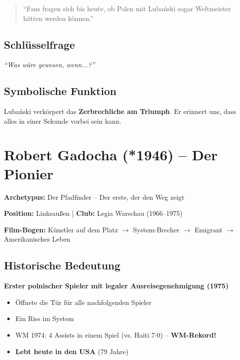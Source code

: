 \documentclass[11pt,a4paper]{book}
\newenvironment{filminfo}{%
  \begin{mdframed}[
    linecolor=darkgray,
    linewidth=1pt,
    backgroundcolor=gray!5,
    innertopmargin=10pt,
    innerbottommargin=10pt
  ]
}{%
  \end{mdframed}
}
\newenvironment{kontextbox}{%
  \begin{mdframed}[
    linecolor=polishred,
    linewidth=1pt,
    backgroundcolor=white,
    leftmargin=20pt,
    rightmargin=20pt
  ]
}{%
  \end{mdframed}
}
\begin{document}
\begin{quote}
``Fans fragen sich bis heute, ob Polen mit Lubański sogar Weltmeister hätten werden können.''
\end{quote}

\subsection{Schlüsselfrage}

\begin{kontextbox}
\textit{``Was wäre gewesen, wenn...?''}
\end{kontextbox}

\subsection{Symbolische Funktion}

Lubański verkörpert das \textbf{Zerbrechliche am Triumph}. Er erinnert uns, dass alles in einer Sekunde vorbei sein kann.


\section{Robert Gadocha (*1946) -- Der Pionier}

\begin{filminfo}
\textbf{Archetypus:} Der Pfadfinder -- Der erste, der den Weg zeigt

\textbf{Position:} Linksaußen | \textbf{Club:} Legia Warschau (1966--1975)

\textbf{Film-Bogen:} Künstler auf dem Platz $\rightarrow$ System-Brecher $\rightarrow$ Emigrant $\rightarrow$ Amerikanisches Leben
\end{filminfo}

\subsection{Historische Bedeutung}

\textbf{Erster polnischer Spieler mit legaler Ausreisegenehmigung (1975)}
\begin{itemize}
    \item Öffnete die Tür für alle nachfolgenden Spieler
    \item Ein Riss im System
    \item WM 1974: 4 Assists in einem Spiel (vs. Haiti 7:0) -- \textbf{WM-Rekord!}
    \item \textbf{Lebt heute in den USA} (79 Jahre)
\end{itemize}
\end{document}
